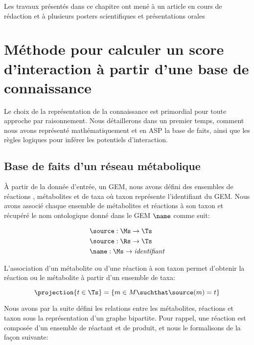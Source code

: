 \documentclass[../main.tex]{subfiles}
\begin{document}
Les travaux présentés dans ce chapitre ont mené à un article en cours de rédaction et à plusieurs posters scientifiques et présentations orales \citep{lecomte:hal-03839337,lecomte:hal-03857781, lecomte:hal-03857848}


\newpage
\section{Méthode pour calculer un score d'interaction à partir d'une base de connaissance}
Le choix de la représentation de la connaissance est primordial pour toute approche par raisonnement. Nous détaillerons dans un premier temps, comment nous avons représenté mathématiquement et en ASP la base de faits, ainsi que les règles logiques pour inférer les potentiels d'interaction.

\subsection{Base de faits d’un réseau métabolique}
À partir de la donnée d'entrée, un GEM, nous avons défini des ensembles de réactions \Rs, métabolites \Ms et de taxa \Ts où taxon représente l'identifiant du GEM. Nous avons associé chaque ensemble de métabolites \Ms et réactions \Rs à son taxon \Ts et récupéré le nom ontologique donné dans le GEM $\name$ comme suit:

\begin{align}
	\begin{split}
		& \source: \Ms \rightarrow \Ts \\
		& \source: \Rs \rightarrow \Ts \\
		& \name: \Ms \rightarrow \mbox{\textit{identifiant}}
	\end{split} 
\end{align}

L'association d'un métabolite ou d'une réaction à son taxon permet d'obtenir la réaction ou le métabolite à partir d'un ensemble de taxa:

\[\projection{t\in\Ts} = \{ m \in M \suchthat \source(m) = t \}\]

Nous avons par la suite défini les relations entre les métabolites, réactions et taxon sous la représentation d'un graphe bipartite. Pour rappel, une réaction est composée d'un ensemble de réactant et de produit, et nous le formalisons de la façon suivante:
\end{document}
